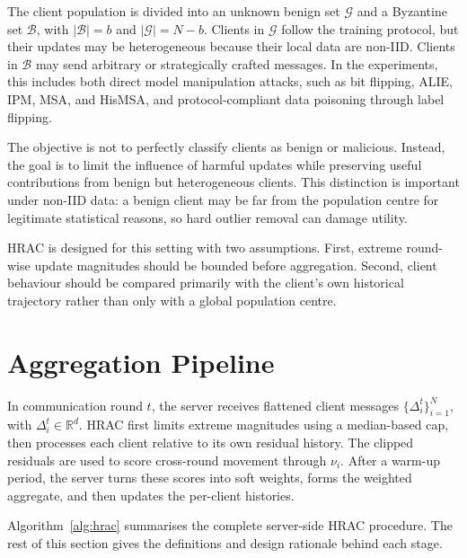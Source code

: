 The client population is divided into an unknown benign set $\mathcal{G}$ and a
Byzantine set $\mathcal{B}$, with $|\mathcal{B}|=b$ and $|\mathcal{G}|=N-b$.
Clients in $\mathcal{G}$ follow the training protocol, but their updates may be
heterogeneous because their local data are non-IID. Clients in $\mathcal{B}$
may send arbitrary or strategically crafted messages. In the experiments, this
includes both direct model manipulation attacks, such as bit flipping, ALIE,
IPM, MSA, and HisMSA, and protocol-compliant data poisoning through label
flipping.

The objective is not to perfectly classify clients as benign or malicious.
Instead, the goal is to limit the influence of harmful updates while preserving
useful contributions from benign but heterogeneous clients. This distinction is
important under non-IID data: a benign client may be far from the population
centre for legitimate statistical reasons, so hard outlier removal can damage
utility.

HRAC is designed for this setting with two assumptions. First, extreme
round-wise update magnitudes should be bounded before aggregation. Second,
client behaviour should be compared primarily with the client's own historical
trajectory rather than only with a global population centre.

\section{Aggregation Pipeline}

In communication round $t$, the server receives flattened client messages
$\{\Delta_i^t\}_{i=1}^{N}$, with $\Delta_i^t \in \mathbb{R}^d$. HRAC first
limits extreme magnitudes using a median-based cap, then processes each client
relative to its own residual history. The clipped residuals are used to score
cross-round movement through \(\nu_i\). After a warm-up period, the server
turns these scores into soft weights, forms the weighted aggregate, and then
updates the per-client histories.

Algorithm~\ref{alg:hrac} summarises the complete server-side HRAC procedure.
The rest of this section gives the definitions and design rationale behind each
stage.

